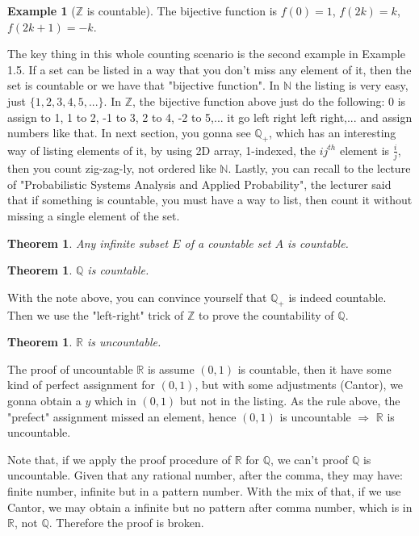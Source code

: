 \documentclass[12pt]{article}
\newcommand{\RR}{\mathbb{R}}   %
\newcommand{\NN}{\mathbb{N}}   %
\newcommand{\ZZ}{\mathbb{Z}}   %
\newcommand{\QQ}{\mathbb{Q}}   %
\theoremstyle{definition}
\newtheorem{example}[definition]{Example}
\theoremstyle{plain}
\newtheorem{theorem}[definition]{Theorem}
\begin{document}
\begin{example}[$\ZZ$ is countable]
The bijective function is $f(0) = 1$, $f(2k) = k$, $f(2k+1) = -k$.
\end{example}

\begin{note}
The key thing in this whole counting scenario is the second example in Example 1.5. If a set can be listed in a way that you don't miss any element of it, then the set is countable or we have that "bijective function". In $\NN$ the listing is very easy, just $\{1,2,3,4,5,...\}$. In $\ZZ$, the bijective function above just do the following: 0 is assign to 1, 1 to 2, -1 to 3, 2 to 4, -2 to 5,... it go left right left right,... and assign numbers like that. In next section, you gonna see $\QQ_+$, which has an interesting way of listing elements of it, by using 2D array, 1-indexed, the $ij^{th}$ element is $\frac{i}{j}$, then you count zig-zag-ly, not ordered like $\NN$. Lastly, you can recall to the lecture of "Probabilistic Systems Analysis and Applied Probability", the lecturer said that if something is countable, you must have a way to list, then count it without missing a single element of the set.
\end{note}

\begin{theorem}
Any infinite subset $E$ of a countable set $A$ is countable.
\end{theorem}

\begin{theorem}
$\QQ$ is countable.    
\end{theorem}

\begin{note}
With the note above, you can convince yourself that $\QQ_+$ is indeed countable. Then we use the "left-right" trick of $\ZZ$ to prove the countability of $\QQ$.
\end{note}

\begin{theorem}
$\RR$ is uncountable.
\end{theorem}

\begin{note}
The proof of uncountable $\RR$ is assume $(0,1)$ is countable, then it have some kind of perfect assignment for $(0,1)$, but with some adjustments (Cantor), we gonna obtain a $y$ which in $(0,1)$ but not in the listing. As the rule above, the "prefect" assignment missed an element, hence $(0,1)$ is uncountable $\Rightarrow$ $\RR$ is uncountable.

Note that, if we apply the proof procedure of $\RR$ for $\QQ$, we can't proof $\QQ$ is uncountable. Given that any rational number, after the comma, they may have: finite number, infinite but in a pattern number. With the mix of that, if we use Cantor, we may obtain a infinite but no pattern after comma number, which is in $\RR$, not $\QQ$. Therefore the proof is broken.
\end{note}
\end{document}
